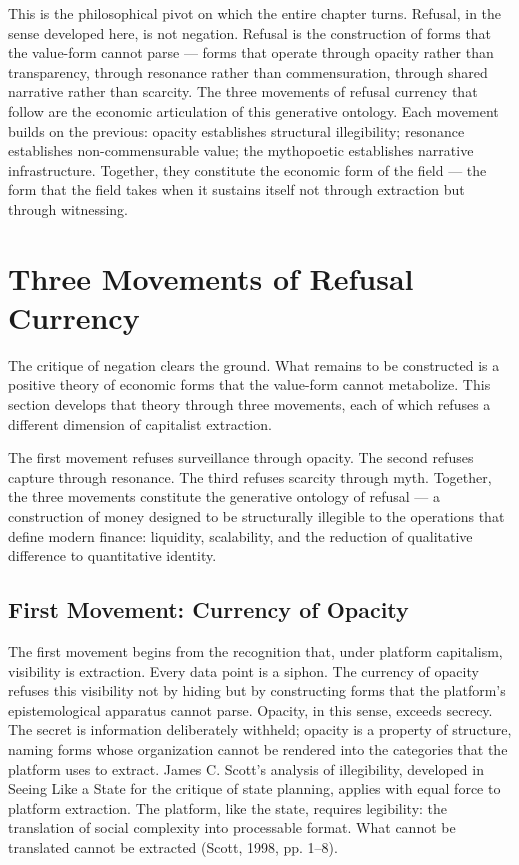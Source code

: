 This is the philosophical pivot on which the entire chapter turns. Refusal, in the sense developed here, is not negation. Refusal is the construction of forms that the value-form cannot parse — forms that operate through opacity rather than transparency, through resonance rather than commensuration, through shared narrative rather than scarcity. The three movements of refusal currency that follow are the economic articulation of this generative ontology. Each movement builds on the previous: opacity establishes structural illegibility; resonance establishes non-commensurable value; the mythopoetic establishes narrative infrastructure. Together, they constitute the economic form of the field — the form that the field takes when it sustains itself not through extraction but through witnessing.

\section{Three Movements of Refusal Currency}

The critique of negation clears the ground. What remains to be constructed is a positive theory of economic forms that the value-form cannot metabolize. This section develops that theory through three movements, each of which refuses a different dimension of capitalist extraction.

The first movement refuses surveillance through opacity. The second refuses capture through resonance. The third refuses scarcity through myth. Together, the three movements constitute the generative ontology of refusal — a construction of money designed to be structurally illegible to the operations that define modern finance: liquidity, scalability, and the reduction of qualitative difference to quantitative identity.

\subsection{First Movement: Currency of Opacity}

The first movement begins from the recognition that, under platform capitalism, visibility is extraction. Every data point is a siphon. The currency of opacity refuses this visibility not by hiding but by constructing forms that the platform's epistemological apparatus cannot parse. Opacity, in this sense, exceeds secrecy. The secret is information deliberately withheld; opacity is a property of structure, naming forms whose organization cannot be rendered into the categories that the platform uses to extract. James C. Scott's analysis of illegibility, developed in Seeing Like a State for the critique of state planning, applies with equal force to platform extraction. The platform, like the state, requires legibility: the translation of social complexity into processable format. What cannot be translated cannot be extracted (Scott, 1998, pp. 1–8).

